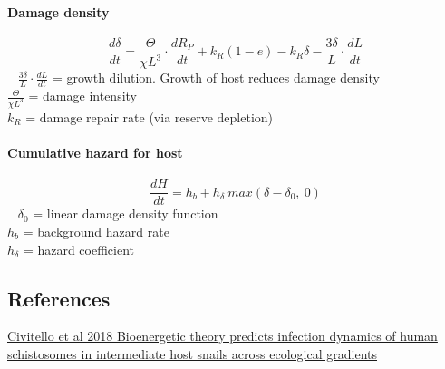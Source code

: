 \documentclass[10,portrait]{article}
\let\oldparagraph\paragraph
\renewcommand{\paragraph}[1]{\oldparagraph{#1}\mbox{}}
\begin{document}
\paragraph{Damage density}\label{damage-density}

\[
  \frac 
    {d \delta}
    {d t}
    = \frac
      {\Theta} 
      {\chi L^{3}} 
      \cdot \frac
      {dR_{P}}
      {dt}
        + k_{R}(1-e)-k_{R}\delta-
        \frac
          {3\delta}
          {L}
          \cdot \frac 
            {dL}
            {dt}
\] ~ \(\frac {3\delta}{L}\cdot \frac {dL}{dt}\) = growth dilution.
Growth of host reduces damage density\\
\(\frac {\Theta} {\chi L^{3}}\) = damage intensity\\
\(k_{R}\) = damage repair rate (via reserve depletion)

\paragraph{Cumulative hazard for host}\label{cumulative-hazard-for-host}

\[
  \frac
  {d H}
  {d t}
  = h_{b}+h_{\delta} \ max(\delta - \delta_{0}, \ 0)
\] ~ \(\delta_{0}\) = linear damage density function\\
\(h_{b}\) = background hazard rate\\
\(h_{\delta}\) = hazard coefficient

\newpage  

\subsection{References}\label{references}

\href{https://onlinelibrary.wiley.com/doi/abs/10.1111/ele.12937}{Civitello
et al 2018 Bioenergetic theory predicts infection dynamics of human
schistosomes in intermediate host snails across ecological gradients}

\printbibliography
\end{document}
